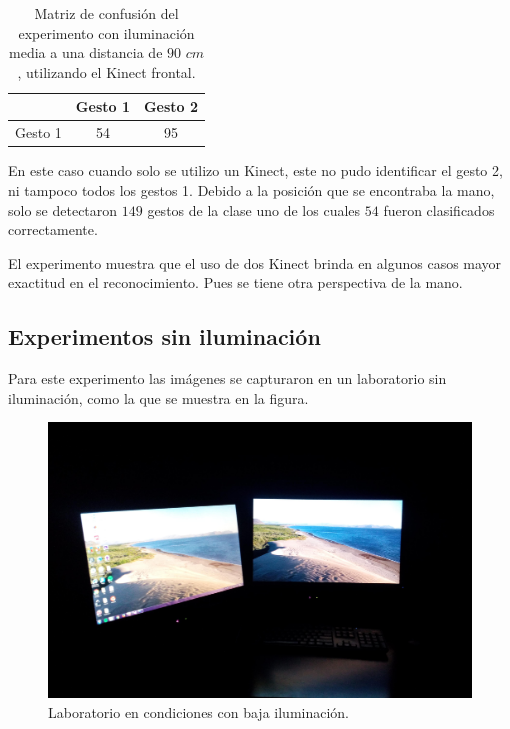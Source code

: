 \begin{itemize}
\begin{table}[h!] 
\begin{center}
\begin{tabular}{ r || c | c |} 
        & Gesto 1 & Gesto 2 \\ \hline \hline  
Gesto 1 &  54    &   95    \\ \hline  
\end{tabular}
\end{center} 
\caption{Matriz de confusión del experimento con iluminación media a una distancia de $90$ $cm$, utilizando el Kinect frontal.} 
\label{table:90LMK1} 
\end{table}  

En este caso cuando solo se utilizo un Kinect, este no pudo identificar el gesto 2, ni tampoco todos los gestos 1. Debido a la posición que se encontraba la mano, solo se detectaron $149$ gestos de la clase uno de los cuales $54$ fueron clasificados correctamente.

El experimento muestra que el uso de dos Kinect brinda en algunos casos mayor exactitud en el reconocimiento. Pues se tiene otra perspectiva de la mano. 

\end{itemize}


\subsection{Experimentos sin iluminación}
Para este experimento las imágenes se capturaron en un laboratorio sin iluminación, como la que se muestra en la figura.

\begin{figure}[h!]
\begin{center} 
\includegraphics[scale=0.09]{./Figures/noIluminacion.jpg}
\end{center}
\caption{Laboratorio en condiciones con baja iluminación.}
\label{fig:LabNoIluminado} 
\end{figure} 

